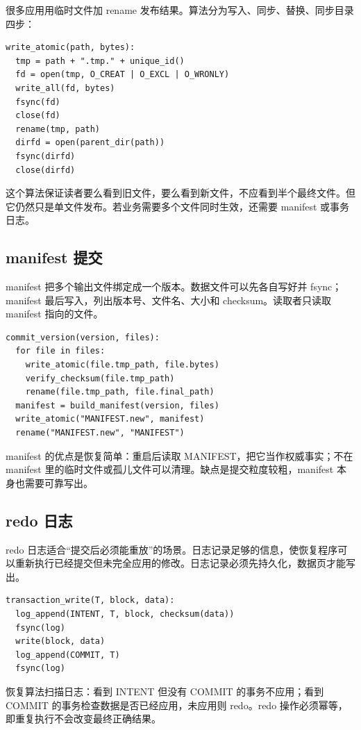 很多应用用临时文件加 rename 发布结果。算法分为写入、同步、替换、同步目录四步：

\begin{lstlisting}
write_atomic(path, bytes):
  tmp = path + ".tmp." + unique_id()
  fd = open(tmp, O_CREAT | O_EXCL | O_WRONLY)
  write_all(fd, bytes)
  fsync(fd)
  close(fd)
  rename(tmp, path)
  dirfd = open(parent_dir(path))
  fsync(dirfd)
  close(dirfd)
\end{lstlisting}

这个算法保证读者要么看到旧文件，要么看到新文件，不应看到半个最终文件。但它仍然只是单文件发布。若业务需要多个文件同时生效，还需要 manifest 或事务日志。

\subsection{manifest 提交}

manifest 把多个输出文件绑定成一个版本。数据文件可以先各自写好并 fsync；manifest 最后写入，列出版本号、文件名、大小和 checksum。读取者只读取 manifest 指向的文件。

\begin{lstlisting}
commit_version(version, files):
  for file in files:
    write_atomic(file.tmp_path, file.bytes)
    verify_checksum(file.tmp_path)
    rename(file.tmp_path, file.final_path)
  manifest = build_manifest(version, files)
  write_atomic("MANIFEST.new", manifest)
  rename("MANIFEST.new", "MANIFEST")
\end{lstlisting}

manifest 的优点是恢复简单：重启后读取 MANIFEST，把它当作权威事实；不在 manifest 里的临时文件或孤儿文件可以清理。缺点是提交粒度较粗，manifest 本身也需要可靠写出。

\subsection{redo 日志}

redo 日志适合“提交后必须能重放”的场景。日志记录足够的信息，使恢复程序可以重新执行已经提交但未完全应用的修改。日志记录必须先持久化，数据页才能写出。

\begin{lstlisting}
transaction_write(T, block, data):
  log_append(INTENT, T, block, checksum(data))
  fsync(log)
  write(block, data)
  log_append(COMMIT, T)
  fsync(log)
\end{lstlisting}

恢复算法扫描日志：看到 INTENT 但没有 COMMIT 的事务不应用；看到 COMMIT 的事务检查数据是否已经应用，未应用则 redo。redo 操作必须幂等，即重复执行不会改变最终正确结果。

